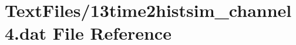 \hypertarget{13time2histsim__channel4_8dat}{}\section{Text\+Files/13time2histsim\+\_\+channel4.dat File Reference}
\label{13time2histsim__channel4_8dat}
